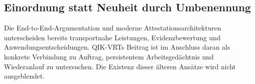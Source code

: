 \begin{cols}
\subsection*{Einordnung statt Neuheit durch Umbenennung}
Die End-to-End-Argumentation und moderne Attestationsarchitekturen unterscheiden bereits transportnahe Leistungen, Evidenzbewertung und Anwendungsentscheidungen. QIK-VRTs Beitrag ist im Anschluss daran als konkrete Verbindung zu Auftrag, persistentem Arbeitsgedächtnis und Wiederanlauf zu untersuchen. Die Existenz dieser älteren Ansätze wird nicht ausgeblendet. 
\end{cols}

